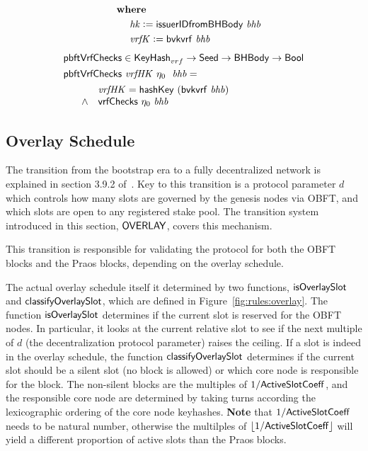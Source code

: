 \begin{figure}
\begin{align*}
\begin{array}{cl}
      \end{array} \\
      & ~~~~~ ~ \mathbf{where}~ ~  \\
      & ~~~~~~~~~~\mathit{hk} \mathrel{\mathop:}= \mathsf{issuerIDfromBHBody}~\mathit{bhb} \\
      & ~~~~~~~~~~\mathit{vrfK} \mathrel{\mathop:}= \mathsf{bvkvrf}~\mathit{bhb} \\
  \end{align*}
  \begin{align*}
      & \mathsf{pbftVrfChecks} \in \mathsf{KeyHash}_{vrf} \to \mathsf{Seed} \to \mathsf{BHBody} \to \mathsf{Bool} \\
      & \mathsf{pbftVrfChecks}~\mathit{vrfHK}~\eta_0~~\mathit{bhb} = \\
      & \begin{array}{cl}
        ~~~~ & \mathit{vrfHK} = \mathsf{hashKey}~ \mathit{(\mathsf{bvkvrf}~\mathit{bhb})} \\
        ~~~~ \land & \mathsf{vrfChecks}~\eta_0~\mathit{bhb} \\
      \end{array} \\
  \end{align*}
  \label{fig:vrf-checks}
\end{figure}

\clearpage

\subsection{Overlay Schedule}
\label{sec:overlay-schedule}

The transition from the bootstrap era to a fully decentralized network is explained in
section 3.9.2 of~\cite{delegation_design}.
Key to this transition is a protocol parameter $d$ which controls how many slots are governed by
the genesis nodes via OBFT, and which slots are open to any registered stake pool.
The transition system introduced in this section, $\mathsf{OVERLAY}$, covers this mechanism.

This transition is responsible for validating the protocol for both the OBFT blocks
and the Praos blocks, depending on the overlay schedule.

The actual overlay schedule itself it determined by two functions,
$\mathsf{isOverlaySlot}$ and $\mathsf{classifyOverlaySlot}$,
which are defined in Figure~\ref{fig:rules:overlay}.
The function $\mathsf{isOverlaySlot}$ determines if the current slot
is reserved for the OBFT nodes.
In particular, it looks at the current relative slot to
see if the next multiple of $d$ (the decentralization protocol parameter)
raises the ceiling.
If a slot is indeed in the overlay schedule,
the function $\mathsf{classifyOverlaySlot}$ determines if the current slot
should be a silent slot (no block is allowed) or which core node
is responsible for the block.
The non-silent blocks are the multiples of $1/\mathsf{ActiveSlotCoeff}$,
and the responsible core node are determined by
taking turns according the lexicographic ordering of the core node keyhashes.
\textbf{Note} that $1/\mathsf{ActiveSlotCoeff}$ needs to be natural number,
otherwise the multilples of $\lfloor 1/\mathsf{ActiveSlotCoeff} \rfloor$
will yield a different proportion of active slots than the Praos blocks.

